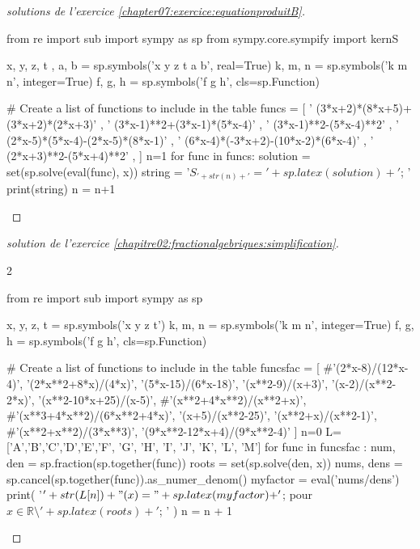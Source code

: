 \documentclass[main.tex]{subfiles}
\begin{document}
\begin{proof}[solutions de l'exercice \ref{chapter07:exercice:equationproduitB}]  
	 \scriptsize  
\begin{pycode}
from re import sub
import sympy as sp
from sympy.core.sympify import kernS

x, y, z, t , a, b = sp.symbols('x y z t a b', real=True)
k, m, n = sp.symbols('k m n', integer=True)
f, g, h = sp.symbols('f g h', cls=sp.Function)

# Create a list of functions to include in the table
funcs = [
' (3*x+2)*(8*x+5)+(3*x+2)*(2*x+3)' ,
' (3*x-1)**2+(3*x-1)*(5*x-4)' ,
' (3*x-1)**2-(5*x-4)**2' ,
' (2*x-5)*(5*x-4)-(2*x-5)*(8*x-1)' ,
' (6*x-4)*(-3*x+2)-(10*x-2)*(6*x-4)' ,
' (2*x+3)**2-(5*x+4)**2' ,
]
n=1 
for func in funcs: 
	solution = set(sp.solve(eval(func), x))
	string =  '$S_{'+str(n)+'}='+   sp.latex(solution ) + '$; '
	print(string) 
	n = n+1
\end{pycode}  
\end{proof}
\begin{proof}[solution de l'exercice \ref{chapitre02:fractionalgebriques:simplification}] \hfill 
 
\begin{multicols}{2}  
\begin{pycode}
from re import sub
import sympy as sp

x, y, z, t = sp.symbols('x y z t')
k, m, n = sp.symbols('k m n', integer=True)
f, g, h = sp.symbols('f g h', cls=sp.Function)

# Create a list of functions to include in the table
funcsfac = [
#'(2*x-8)/(12*x-4)',
'(2*x**2+8*x)/(4*x)',
'(5*x-15)/(6*x-18)',
'(x**2-9)/(x+3)',
'(x-2)/(x**2-2*x)',
'(x**2-10*x+25)/(x-5)',
#'(x**2+4*x**2)/(x**2+x)',
#'(x**3+4*x**2)/(6*x**2+4*x)',
'(x+5)/(x**2-25)',
'(x**2+x)/(x**2-1)',
#'(x**2+x**2)/(3*x**3)',
'(9*x**2-12*x+4)/(9*x**2-4)'
]
n=0
L=['A','B','C','D','E','F', 'G', 'H', 'I', 'J', 'K', 'L', 'M']
for func in funcsfac :
	num, den =  sp.fraction(sp.together(func))
	roots = set(sp.solve(den, x))
	nums, dens = sp.cancel(sp.together(func)).as_numer_denom()
	myfactor =  eval('nums/dens')
	print( '$'+ str(L[n])  + "(x)=" + sp.latex(myfactor) + '$; pour $x\in\mathbb{R}\setminus'+ sp.latex(roots ) + '$; \n' )
	n     = n + 1
\end{pycode}
\end{multicols}
\end{proof}
\end{document}
